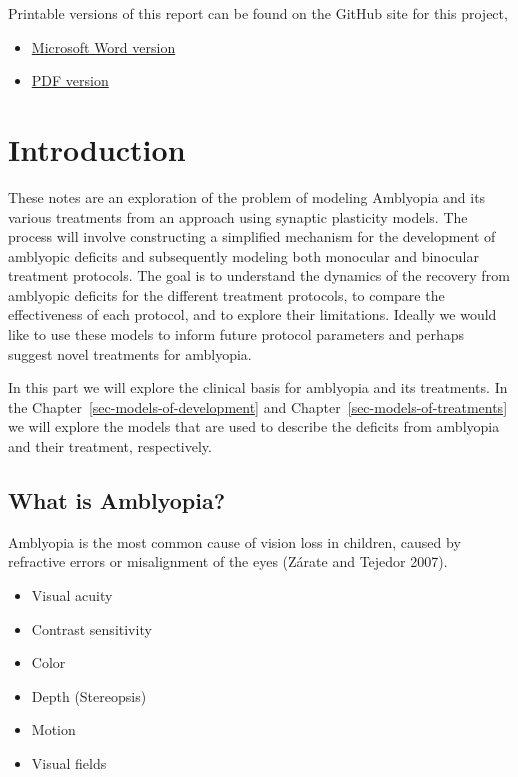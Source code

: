 \documentclass[
  letterpaper,
]{book}
\providecommand{\tightlist}{%
  \setlength{\itemsep}{0pt}\setlength{\parskip}{0pt}}\usepackage{longtable,booktabs,array}
\begin{document}
Printable versions of this report can be found on the GitHub site for
this project,

\begin{itemize}
\tightlist
\item
  \href{https://github.com/bblais/Amblyopia-Simulation/raw/main/docs/Comparing-Treatments-for-Amblyopia-with-a-Synaptic-Plasticity-Model.docx}{Microsoft
  Word version}
\item
  \href{https://github.com/bblais/Amblyopia-Simulation/raw/main/docs/Comparing-Treatments-for-Amblyopia-with-a-Synaptic-Plasticity-Model.pdf}{PDF
  version}
\end{itemize}

\part{Introduction}

These notes are an exploration of the problem of modeling Amblyopia and
its various treatments from an approach using synaptic plasticity
models. The process will involve constructing a simplified mechanism for
the development of amblyopic deficits and subsequently modeling both
monocular and binocular treatment protocols. The goal is to understand
the dynamics of the recovery from amblyopic deficits for the different
treatment protocols, to compare the effectiveness of each protocol, and
to explore their limitations. Ideally we would like to use these models
to inform future protocol parameters and perhaps suggest novel
treatments for amblyopia.

In this part we will explore the clinical basis for amblyopia and its
treatments. In the Chapter~\ref{sec-models-of-development} and
Chapter~\ref{sec-models-of-treatments} we will explore the models that
are used to describe the deficits from amblyopia and their treatment,
respectively.

\hypertarget{what-is-amblyopia}{%
\chapter{What is Amblyopia?}\label{what-is-amblyopia}}

Amblyopia is the most common cause of vision loss in children, caused by
refractive errors or misalignment of the eyes (Zárate and Tejedor 2007).

\begin{itemize}
\tightlist
\item
  Visual acuity
\item
  Contrast sensitivity
\item
  Color
\item
  Depth (Stereopsis)
\item
  Motion
\item
  Visual fields
\end{itemize}
\end{document}
